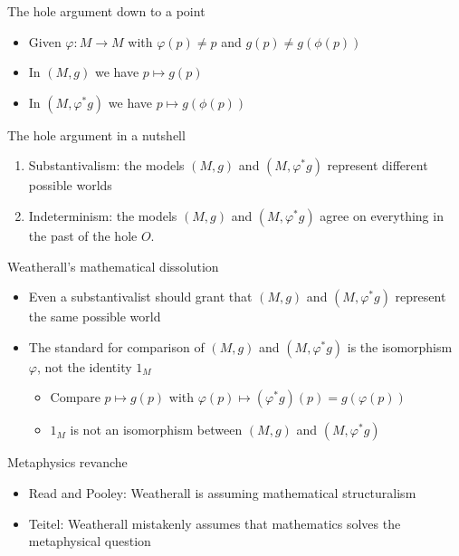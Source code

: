 \documentclass{beamer}
\begin{document}
\begin{frame}{The hole argument down to a point}

  \begin{itemize}
  \item Given $\varphi :M\to M$ with $\varphi (p)\neq p$ and $g(p)\neq
    g(\phi (p))$
  \item In $(M,g)$ we have $p\mapsto g(p)$
  \item In $(M,\varphi ^*g)$ we have $p\mapsto g(\phi (p))$
  \end{itemize}


\end{frame}

\begin{frame}{The hole argument in a nutshell}

  \begin{enumerate}
  \item Substantivalism: the models $(M,g)$ and $(M,\varphi ^*g)$
    represent different possible worlds
  \item Indeterminism: the models $(M,g)$ and $(M,\varphi ^*g)$
    agree on everything in the past of the hole $O$.
  \end{enumerate}


\end{frame}


\begin{frame}{Weatherall's mathematical dissolution}

  \begin{itemize}
  \item Even a substantivalist should grant that $(M,g)$ and
    $(M,\varphi ^*g)$ represent the same possible world
  \item The standard for comparison of $(M,g)$ and $(M,\varphi ^*g)$
    is the isomorphism $\varphi$, not the identity $1_M$
    \begin{itemize}
     \item Compare $p\mapsto g(p)$ with $\varphi (p)\mapsto (\varphi
       ^*g)(p)=g(\varphi (p))$
     \item $1_M$ is not an isomorphism between $(M,g)$ and
       $(M,\varphi ^*g)$
    \end{itemize}
  \end{itemize}


\end{frame}

\begin{frame}{Metaphysics revanche}

  \begin{itemize}
  \item Read and Pooley: Weatherall is assuming mathematical
    structuralism
  \item Teitel: Weatherall mistakenly assumes that mathematics solves
    the metaphysical question
  \end{itemize}



  \end{frame}
\end{document}
